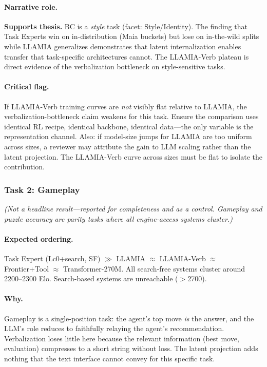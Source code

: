 \paragraph{Narrative role.}
\textbf{Supports thesis.} BC is a \emph{style} task (facet:
Style/Identity). The finding that Task Experts win on
in-distribution (Maia buckets) but lose on in-the-wild splits while
LLAMIA generalizes demonstrates that latent internalization enables
transfer that task-specific architectures cannot. The LLAMIA-Verb
plateau is direct evidence of the verbalization bottleneck on
style-sensitive tasks.

\paragraph{Critical flag.}
If LLAMIA-Verb training curves are \emph{not} visibly flat relative
to LLAMIA, the verbalization-bottleneck claim weakens for this task.
Ensure the comparison uses identical RL recipe, identical backbone,
identical data---the only variable is the representation channel.
Also: if model-size jumps for LLAMIA are too uniform across sizes, a
reviewer may attribute the gain to LLM scaling rather than the latent
projection. The LLAMIA-Verb curve across sizes must be flat to
isolate the contribution.

\subsubsection*{Task 2: Gameplay}
\label{sec:perf_gameplay}

\textit{(Not a headline result---reported for completeness and as a
control. Gameplay and puzzle accuracy are parity tasks where all
engine-access systems cluster.)}

\paragraph{Expected ordering.}
Task Expert (Lc0+search, SF) $\gg$ LLAMIA $\approx$ LLAMIA-Verb
$\approx$ Frontier+Tool $\approx$ Transformer-270M. All search-free
systems cluster around 2200--2300 Elo. Search-based systems are
unreachable ($>$2700).

\paragraph{Why.}
Gameplay is a single-position task: the agent's top move \emph{is}
the answer, and the LLM's role reduces to faithfully relaying the
agent's recommendation. Verbalization loses little here because the
relevant information (best move, evaluation) compresses to a short
string without loss. The latent projection adds nothing that the
text interface cannot convey for this specific task.

